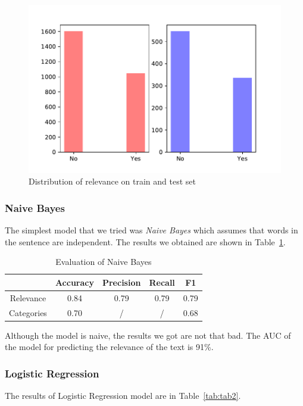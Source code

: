 \documentclass[11pt,a4paper]{article}
\begin{document}
\begin{figure}[h]
    \centering
    \includegraphics[width=1.1\columnwidth]{Figures/distribution.pdf}
    \caption{Distribution of relevance on train and test set}
    \label{fig:fig1}
\end{figure}

\subsubsection{Naive Bayes}
The simplest model that we tried was \textit{Naive Bayes} which assumes that words in the sentence are independent.
The results we obtained are shown in Table~\ref{tab:tab1}.

\begin{table}[h]
    \centering
    \begin{tabular}{ c | c c c c } 
         & Accuracy & Precision & Recall & F1 \\ 
         \hline
         Relevance & 0.84 & 0.79 & 0.79 & 0.79 \\
         Categories & 0.70 & / & / & 0.68 \\
    \end{tabular}
    \caption{Evaluation of Naive Bayes}
    \label{tab:tab1}
\end{table}

Although the model is naive, the results we got are not that bad.
The AUC of the model for predicting the relevance of the text is 91\%.

\subsubsection{Logistic Regression}
The results of Logistic Regression model are in Table~\ref{tab:tab2}.
\end{document}
